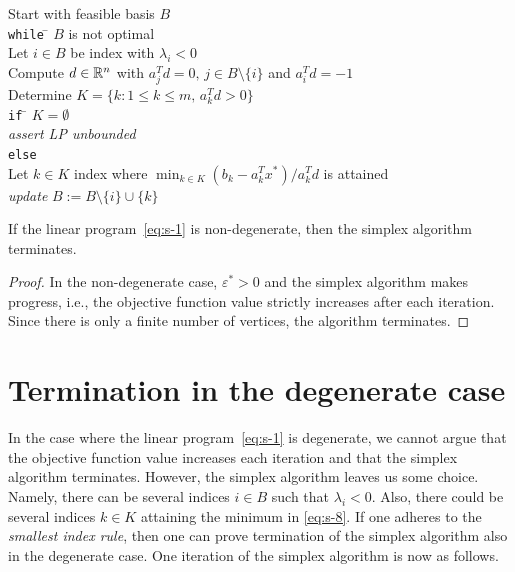 \newpage
\begin{algorithm}
  \begin{tabbing}
    Start with feasible basis $B$ \\[1ex]
    {\tt while} \= $B$ is not optimal \\ [.7ex]
    \> Let $i \in B$ be index with $\lambda_i<0$ \\
    \> Compute  $d \in \mathbb{R}^n$ with $a_j^T d = 0, \, j \in B \setminus\{i\}$
    and $a_i^T d = -1$ \\ 
    \> Determine $K = \{ k \colon 1 \leq k \leq m, \, a_k^Td >0\}$\\[.7ex]  
    \> {\tt if} \= $K = \emptyset$ \\   
    \> \> \emph{assert LP unbounded} \\
    \> {\tt else} \\
    \> \> Let $k \in K$ index where 
    $
    \displaystyle \min_{k \in K} (b_k - a_k^Tx^*)/a_k^Td
    $
    is attained \\ %
    
    \> \>\emph{update} $B := B \setminus\{i\} \cup \{k\}$             
  \end{tabbing}
  
\end{algorithm}
  


\begin{theorem}
  \label{thr:s-5}
  If the linear program~\eqref{eq:s-1} is non-degenerate, then the
  simplex algorithm terminates.
\end{theorem}

\begin{proof}
  In the non-degenerate case, $\varepsilon^*>0$ and the simplex
  algorithm makes progress, i.e., the objective function value
  strictly increases after each iteration. Since there is only a
  finite number of vertices, the algorithm terminates.
\end{proof}

  
\section{Termination in the degenerate case}
\label{sec:term-degen-case}


In the case where the linear program~\eqref{eq:s-1} is degenerate, we cannot argue that the objective function value increases each iteration and that the simplex algorithm terminates. However, the simplex algorithm leaves us some choice. Namely, there can be several indices $i \in B$ such that $\lambda_i<0$. Also, there could be several indices $k \in K$ attaining the minimum in \eqref{eq:s-8}. If one adheres to the  \emph{smallest index rule}, then one can prove termination of the simplex algorithm also in the degenerate case. One iteration of the simplex algorithm is now as follows. 



